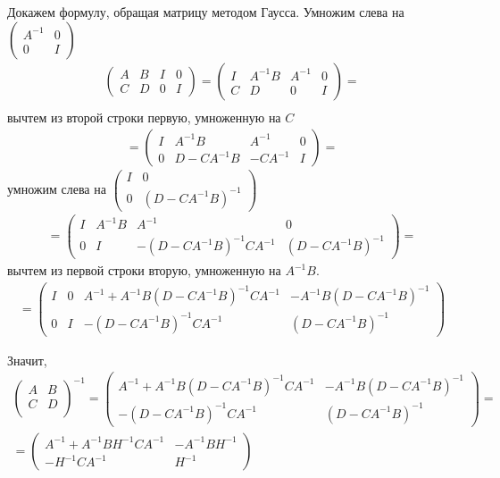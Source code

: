 \begin{problem}
\begin{sol}
Докажем формулу, обращая матрицу методом Гаусса. Умножим слева на $\begin{pmatrix}
A^{-1} & 0\\
0 & I
\end{pmatrix}$
\begin{multline*}
\left(\begin{array}{cc|cc}
A & B & I & 0\\
C & D & 0 & I
\end{array}\right)=
\left(\begin{array}{cc|cc}
I & A^{-1}B & A^{-1} & 0\\
C & D & 0 & I
\end{array}\right)=\\
\end{multline*}
вычтем из второй строки первую, умноженную на $C$
\begin{multline*}
=\left(\begin{array}{cc|cc}
I & A^{-1}B & A^{-1} & 0\\
0 & D-CA^{-1}B & -CA^{-1} & I
\end{array}\right)=
\end{multline*}
умножим слева на $\begin{pmatrix}
I & 0\\
0 & (D-CA^{-1}B)^{-1}
\end{pmatrix}$
\begin{multline*}
=\left(\begin{array}{cc|cc}
I & A^{-1}B & A^{-1} & 0\\
0 & I & -(D-CA^{-1}B)^{-1}CA^{-1} & (D-CA^{-1}B)^{-1}
\end{array}\right)=
\end{multline*}
вычтем из первой строки вторую, умноженную на $A^{-1}B$.
\begin{multline*}
=\left(\begin{array}{cc|cc}
I & 0 & A^{-1}+A^{-1}B(D-CA^{-1}B)^{-1}CA^{-1} & -A^{-1}B(D-CA^{-1}B)^{-1}\\
0 & I & -(D-CA^{-1}B)^{-1}CA^{-1} & (D-CA^{-1}B)^{-1}
\end{array}\right)
\end{multline*}

Значит,
\begin{multline*}
\begin{pmatrix} A & B \\ C & D \\ \end{pmatrix}^{-1}
=\left(\begin{array}{cc}
A^{-1}+A^{-1}B(D-CA^{-1}B)^{-1}CA^{-1} & -A^{-1}B(D-CA^{-1}B)^{-1}\\
-(D-CA^{-1}B)^{-1}CA^{-1} & (D-CA^{-1}B)^{-1}
\end{array}\right)=\\=
\begin{pmatrix} A^{-1} +A^{-1} BH^{-1} CA^{-1}  & -A^{-1} BH^{-1}\\ -H^{-1} CA^{-1}  & H^{-1}\end{pmatrix}
\end{multline*}


\end{sol}
\end{problem}
